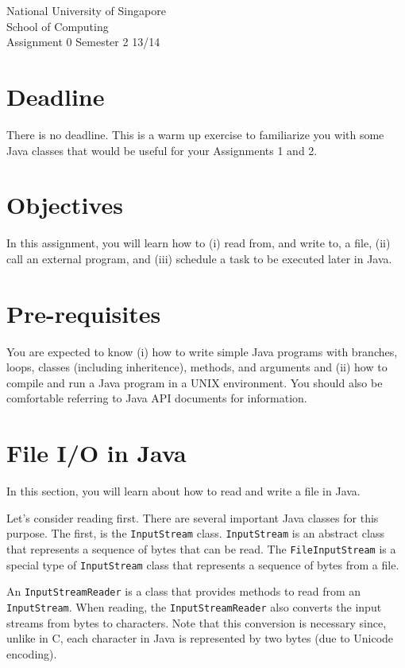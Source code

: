 \documentclass[a4paper,11pt]{exam}
\begin{document}
    \extraheadheight{.5in}
    {\large\sf National University of Singapore\\ School of Computing \\
    \LARGE\sf Assignment 0}%
    {\large\sf Semester 2 13/14}
    \firstpageheadrule
    \pagestyle{headandfoot}

    \section*{Deadline}

    There is no deadline.  This is a warm up exercise to familiarize you with some Java classes that would be useful for your Assignments 1 and 2.

    \section*{Objectives}

    In this assignment, you will learn how to (i) read from, and write to, a file, (ii) call an external program, and (iii) schedule a task to be executed later in Java. 

    \section*{Pre-requisites}

    You are expected to know (i) how to write simple Java programs with branches, loops, classes (including inheritence), methods, and arguments and (ii) how to compile and run a Java program in a UNIX environment.  You should also be comfortable referring to  Java API documents for information.


\section*{File I/O in Java}

In this section, you will learn about how to read and write a file in Java.  

Let's consider reading first.  There are several important Java classes for this purpose.  The first, is the \texttt{InputStream} class.  \texttt{InputStream} is an abstract class that represents a sequence of bytes that can be read.  The \texttt{FileInputStream} is a special type of \texttt{InputStream} class that represents a sequence of bytes from a file.  

An \texttt{InputStreamReader} is a class that provides methods to read from an \texttt{InputStream}.  When reading, the \texttt{InputStreamReader} also converts the input streams from bytes to characters.  Note that this conversion is necessary since, unlike in C, each character in Java is represented by two bytes (due to Unicode encoding). 
\end{document}
